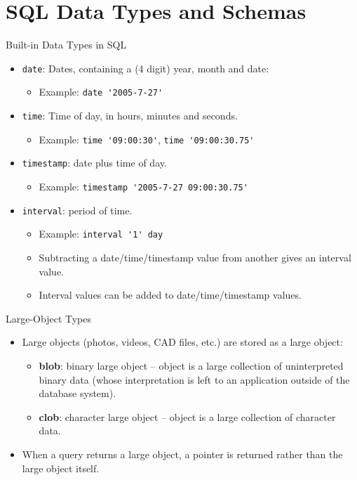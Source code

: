 \documentclass[aspectratio=169]{beamer}
\begin{document}
\section{SQL Data Types and Schemas}

\begin{frame}[fragile]{Built-in Data Types in SQL}
    \begin{itemize}
        \item \texttt{date}: Dates, containing a (4 digit) year, month and date:
        \begin{itemize}
            \item Example: \verb|date '2005-7-27'|
        \end{itemize}
        \item \texttt{time}: Time of day, in hours, minutes and seconds.
        \begin{itemize}
            \item Example: \verb|time '09:00:30'|,  \verb|time '09:00:30.75'|
        \end{itemize}
        \item \texttt{timestamp}: date plus time of day.
        \begin{itemize}
            \item Example: \verb|timestamp '2005-7-27 09:00:30.75'|
        \end{itemize}
        \item \texttt{interval}: period of time.
        \begin{itemize}
            \item Example: \verb|interval '1' day|
            \item Subtracting a date/time/timestamp value from another gives an interval value.
            \item Interval values can be added to date/time/timestamp values.
        \end{itemize}
    \end{itemize}
\end{frame}

\begin{frame}{Large-Object Types}
    \begin{itemize}
        \item Large objects (photos, videos, CAD files, etc.) are stored as a large object:
        \begin{itemize}
            \item \textbf{blob}: binary large object -- object is a large collection of uninterpreted binary data (whose interpretation is left to an application outside of the database system).
            \item \textbf{clob}: character large object -- object is a large collection of character data.
        \end{itemize}
        \item When a query returns a large object, a pointer is returned rather than the large object itself.
    \end{itemize}
\end{frame}
\end{document}
